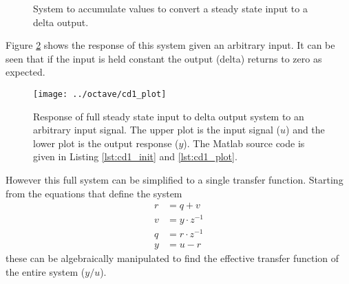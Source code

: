 \documentclass{article}
\begin{document}
\begin{figure}[hpb!]
\begin{center}


\end{center}

\caption{System to accumulate values to convert a steady state
input to a delta output.}
\label{fig:cd1}
\end{figure}


Figure \ref{fig:cd1_plot} shows the response of this system given
an arbitrary input.
It can be seen that if the input is held constant the output (delta)
returns to zero as expected.

\begin{figure}[htbp!]
\texttt{[image: ../octave/cd1\_plot]}
\caption{Response of full steady state input to delta output system
to an arbitrary input signal.
The upper plot is the input signal ($u$) and the lower plot is
the output response ($y$).
The Matlab source code is given in Listing \ref{lst:cd1_init}
and \ref{lst:cd1_plot}.
}
\label{fig:cd1_plot}
\end{figure}

\begin{samepage}
However this full system can be simplified to a single transfer function.
Starting from the equations that define the system
\begin{align}
	r &= q + v \label{eq:cd1a} \\
	v &= y \cdot z^{-1} \label{eq:cd1b} \\
	q &= r \cdot z^{-1} \label{eq:cd1c} \\
	y &= u - r \label{eq:cd1d}
\end{align}
these can be algebraically manipulated to find the effective transfer
function of the entire system ($y/u$).
\end{samepage}
\end{document}
